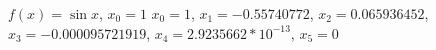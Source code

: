 {$f(x) = \sin x$, $x_0=1$
}
{$x_0=1$, $x_1=-0.55740772$, $x_2=0.065936452$, $x_3=-0.000095721919$, $x_4=2.9235662*10^{-13}$, $x_5=0$
}
